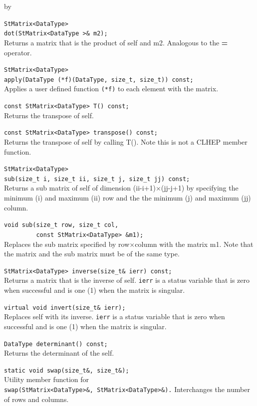 \documentclass[twoside]{article}
\newcommand{\comp}[1]{\texttt{#1}}%
\newcommand{\entrylabel}[1]{\mbox{\textbf{{#1}}}\hfil}%
\newenvironment{entry}
{\begin{list}{}%
    {\renewcommand{\makelabel}{\entrylabel}%
     \setlength{\labelwidth}{90pt}%
     \setlength{\leftmargin}{\labelwidth}
     \advance\leftmargin by \labelsep%
      }%
    }%
  {\end{list}}
\newcommand{\Entrylabel}[1]%
{\raisebox{0pt}[1ex][0pt]{\makebox[\labelwidth][l]%
    {\parbox[t]{\labelwidth}{\hspace{0pt}\textbf{{#1}}}}}}
\newenvironment{Entry}%
{\renewcommand{\entrylabel}{\Entrylabel}\begin{entry}}%
  {\end{entry}}
\begin{document}
\begin{Entry}
  \verb+StMatrix<DataType>+\\
  \verb+dot(StMatrix<DataType >& m2);+\\
  Returns a matrix that is the product of self and m2.  Analogous to
  the {\bf *=} operator.
  
  \verb+StMatrix<DataType>+\\
  \verb+apply(DataType (*f)(DataType, size_t, size_t)) const;+\\
  Applies a user defined function \comp{(*f)} to each element with the
  matrix.
  
  \verb+const StMatrix<DataType> T() const;+\\
  Returns the transpose of self.

  \verb+const StMatrix<DataType> transpose() const;+\\
  Returns the transpose of self by calling T().  Note this
  is not a CLHEP member function.

  \verb+StMatrix<DataType>+\\
  \verb+sub(size_t i, size_t ii, size_t j, size_t jj) const;+\\
  Returns a sub matrix of self of dimension (ii-i+1)$\times$(jj-j+1) by
  specifying the minimum (i) and maximum (ii) row and the the minimum (j)
  and maximum (jj) column.

  \verb+void sub(size_t row, size_t col,+\\
  \verb+         const StMatrix<DataType> &m1);+\\
  Replaces the sub matrix specified by row$\times$column with
  the matrix m1.  Note that the matrix and the sub matrix must
  be of the same type.
  
  \verb+StMatrix<DataType> inverse(size_t& ierr) const;+\\
  Returns a matrix that is the inverse of self.  \comp{ierr}
  is a status variable that is zero when successful and is
  one (1) when the matrix is singular.
    
  \verb+virtual void invert(size_t& ierr);+\\
  Replaces self with its inverse.  \comp{ierr}
  is a status variable that is zero when successful and is
  one (1) when the matrix is singular.

  \verb+DataType determinant() const;+\\
  Returns the determinant of the self.

  \verb+static void swap(size_t&, size_t&);+\\
  Utility member function for \\
  \verb+swap(StMatrix<DataType>&, StMatrix<DataType>&).+
  Interchanges the number of rows and columns.
  

\end{Entry}
\end{document}
